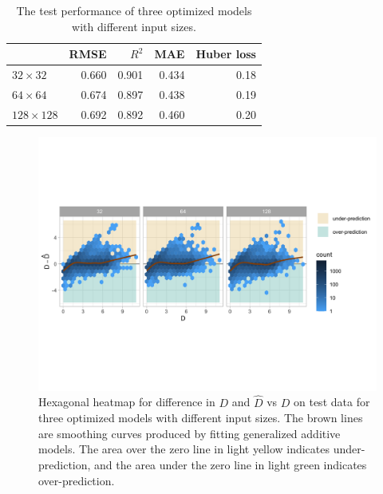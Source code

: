 \documentclass[]{interact}
\theoremstyle{plain}%
\theoremstyle{definition}
\theoremstyle{remark}
\begin{document}
\begin{table}

\caption{\label{tab:performance}The test performance of three optimized models with different input sizes.}
\centering
\begin{tabular}[t]{lrrrr}
\toprule
 & RMSE & $R^2$ & MAE & Huber loss\\
\midrule
$32 \times 32$ & 0.660 & 0.901 & 0.434 & 0.18\\
$64 \times 64$ & 0.674 & 0.897 & 0.438 & 0.19\\
$128 \times 128$ & 0.692 & 0.892 & 0.460 & 0.20\\
\bottomrule
\end{tabular}
\end{table}

\begin{figure}[!h]

{\centering \includegraphics[width=1\linewidth]{paper_files/figure-latex/model-performance-1} 

}

\caption{Hexagonal heatmap for difference in $D$ and $\hat{D}$ vs $D$ on test data for three optimized models with different input sizes. The brown lines are smoothing curves produced by fitting generalized additive models. The area over the zero line in light yellow indicates under-prediction, and the area under the zero line in light green indicates over-prediction.}\label{fig:model-performance}
\end{figure}
\end{document}
